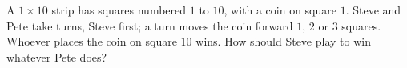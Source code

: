 A $1\times10$ strip has squares numbered $1$ to $10$, with a coin on square $1$. Steve and Pete take turns, Steve first; a turn moves the coin forward $1$, $2$ or $3$ squares. Whoever places the coin on square $10$ wins. How should Steve play to win whatever Pete does?
